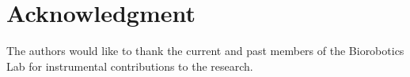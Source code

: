 \documentclass[letterpaper, 10 pt, conference]{ieeeconf}
\begin{document}
%



\addtolength{\textheight}{-1cm}

\section*{Acknowledgment}

The authors would like to thank the current and past members of the Biorobotics Lab for instrumental contributions to the research.



\end{document}
